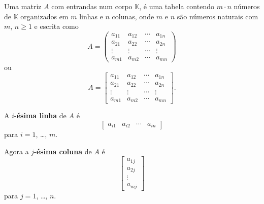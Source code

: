 \documentclass{beamer}
\begin{document}
    \begin{frame}
      \begin{definicao}
        Uma matriz $A$ com entrandas num corpo $\mathbb{K}$, é uma tabela contendo $m\cdot n$ números de $\mathbb{K}$ organizados em $m$ linhas e $n$ colunas, onde $m$ e $n$ são números naturais com $m$, $n \ge 1$ e escrita como
            \begin{displaymath}
                A = \begin{pmatrix}
                a_{11} & a_{12} & \cdots & a_{1n}\\
                a_{21} & a_{22} & \cdots & a_{2n}\\
                \vdots & \vdots & \cdots & \vdots\\
                a_{m1} & a_{m2} & \cdots & a_{mn}
            \end{pmatrix}\end{displaymath}
        ou
        \begin{displaymath}
          A = \begin{bmatrix}
            a_{11} & a_{12} & \cdots & a_{1n}\\
            a_{21} & a_{22} & \cdots & a_{2n}\\
            \vdots & \vdots & \cdots & \vdots\\
            a_{m1} & a_{m2} & \cdots & a_{mn}
          \end{bmatrix}.
        \end{displaymath}

      \end{definicao}
    \end{frame}

    \begin{frame}
      A $i$-\textbf{ésima linha} de $A$ é
      \[
        \begin{bmatrix} a_{i1} & a_{i2} & \cdots & a_{in} \end{bmatrix}
      \]
      para $i = 1$, \dots, $m$.

      Agora a $j$-\textbf{ésima coluna} de $A$ é
      \[
        \begin{bmatrix}
          a_{1j}\\
          a_{2j}\\
          \vdots\\
          a_{mj}
        \end{bmatrix}
      \]
      para $j=1$, \dots, $n$.
    \end{frame}
\end{document}

